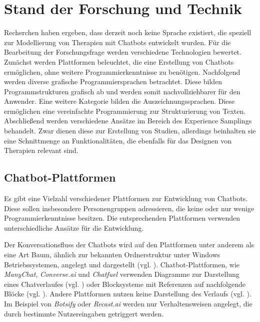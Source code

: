 
\chapter{Stand der Forschung und Technik}
\label{ch:Analysis}

Recherchen haben ergeben, dass derzeit noch keine Sprache existiert, die speziell zur Modellierung von Therapien mit Chatbots entwickelt wurden. Für die Bearbeitung der Forschungsfrage werden verschiedene Technologien bewertet. Zunächst werden Plattformen beleuchtet, die eine Erstellung von Chatbots ermöglichen, ohne weitere Programmierkenntnisse zu benötigen. Nachfolgend werden diverse grafische Programmiersprachen betrachtet. Diese bilden Programmstrukturen grafisch ab und werden somit nachvollziehbarer für den Anwender. Eine weitere Kategorie bilden die Auszeichnungssprachen. Diese ermöglichen eine vereinfachte Programmierung zur Strukturierung von Texten. Abschließend werden verschiedene Ansätze im Bereich des Experience Samplings behandelt. Zwar dienen diese zur Erstellung von Studien, allerdings beinhalten sie eine Schnittmenge an Funktionalitäten, die ebenfalls für das Designen von Therapien relevant sind. 


\section{Chatbot-Plattformen}

Es gibt eine Vielzahl verschiedener Plattformen zur Entwicklung von Chatbots. Diese sollen insbesondere Personengruppen adressieren, die keine oder nur wenige Programmierkenntnisse besitzen. Die entsprechenden Plattformen verwenden unterschiedliche Ansätze für die Entwicklung. 

Der Konversationsfluss der Chatbots wird auf den Plattformen unter anderem als eine Art Baum, ähnlich zur bekannten Ordnerstruktur unter Windows Betriebssystemen, angelegt und dargestellt (vgl. \cite{Dialogfl40:online} \cite{KatalogI56:online}). Chatbot-Plattformen, wie \emph{ManyChat}, \emph{Converse.ai} und \emph{Chatfuel} verwenden Diagramme zur Darstellung eines Chatverlaufes (vgl. \cite{Converse15:online} \cite{WelcomeM66:online}) oder Blocksysteme mit Referenzen auf nachfolgende Blöcke (vgl. \cite{Chatfuel3:online}). Andere Plattformen nutzen keine Darstellung des Verlaufs (vgl. \cite{BotsifyC64:online}). Im Beispiel von \emph{Botsify} oder \emph{Recast.ai} werden nur Verhaltensweisen angelegt, die durch bestimmte Nutzereingaben getriggert werden. 

